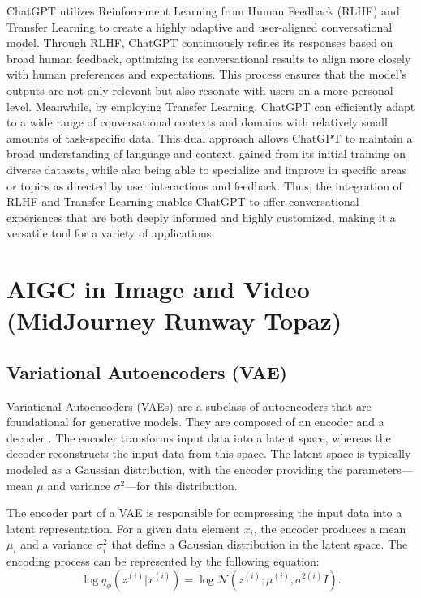 \documentclass[11pt,a4paper,oneside]{report}
\begin{document}
ChatGPT utilizes Reinforcement Learning from Human Feedback (RLHF) and Transfer Learning to create a highly adaptive and user-aligned conversational model. 
Through RLHF, ChatGPT continuously refines its responses based on broad human feedback, optimizing its conversational results to align more closely with human preferences and expectations. 
This process ensures that the model's outputs are not only relevant but also resonate with users on a more personal level. 
Meanwhile, by employing Transfer Learning, ChatGPT can efficiently adapt to a wide range of conversational contexts and domains with relatively small amounts of task-specific data. 
This dual approach allows ChatGPT to maintain a broad understanding of language and context, gained from its initial training on diverse datasets, while also being able to specialize and improve in specific areas or topics as directed by user interactions and feedback. 
Thus, the integration of RLHF and Transfer Learning enables ChatGPT to offer conversational experiences that are both deeply informed and highly customized, making it a versatile tool for a variety of applications.

\section{AIGC in Image and Video (MidJourney Runway Topaz)}

\subsection{Variational Autoencoders (VAE)}

Variational Autoencoders (VAEs) are a subclass of autoencoders that are foundational for generative models. They are composed of an encoder and a decoder \cite{cho2014properties}. The encoder transforms input data into a latent space, whereas the decoder reconstructs the input data from this space. The latent space is typically modeled as a Gaussian distribution, with the encoder providing the parameters—mean $\mu$ and variance $\sigma^2$—for this distribution.

The encoder part of a VAE is responsible for compressing the input data into a latent representation. For a given data element $x_i$, the encoder produces a mean $\mu_i$ and a variance $\sigma^2_i$ that define a Gaussian distribution in the latent space. The encoding process can be represented by the following equation:
\begin{equation}
\log q_{\phi} \left( z^{(i)} | x^{(i)} \right) = \log \mathcal{N} \left( z^{(i)}; \mu^{(i)}, \sigma^{2(i)} I \right).
\end{equation}
\end{document}
